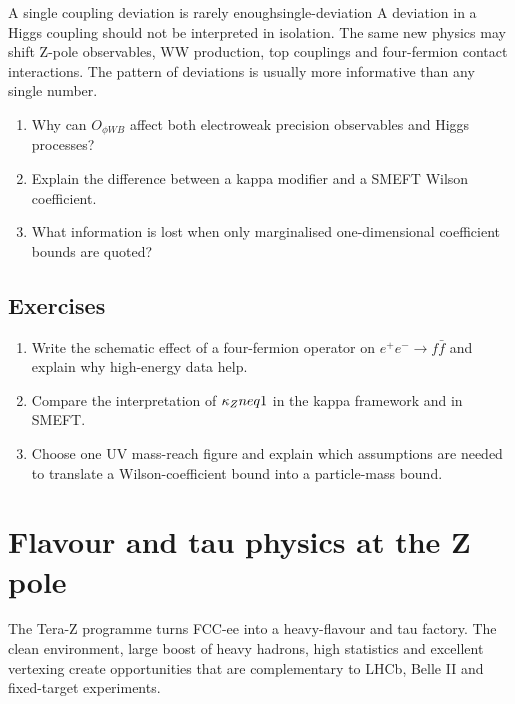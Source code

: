 \documentclass[11pt,a4paper]{article}
\numberwithin{equation}{section}
\begin{document}
\begin{remarkbox}{A single coupling deviation is rarely enough}{single-deviation}
A deviation in a Higgs coupling should not be interpreted in isolation. The same new physics may shift Z-pole observables, WW production, top couplings and four-fermion contact interactions. The pattern of deviations is usually more informative than any single number.
\end{remarkbox}

\begin{guidedchecksbox}
\begin{enumerate}[leftmargin=1.6em]
\item Why can \(O_{\phi WB}\) affect both electroweak precision observables and Higgs processes?
\item Explain the difference between a kappa modifier and a SMEFT Wilson coefficient.
\item What information is lost when only marginalised one-dimensional coefficient bounds are quoted?
\end{enumerate}
\end{guidedchecksbox}

\subsection{Exercises}
\begin{enumerate}[leftmargin=1.6em]
\item Write the schematic effect of a four-fermion operator on \(e^+e^-\to f\bar f\) and explain why high-energy data help.
\item Compare the interpretation of \(\kappa_Z\\neq1\) in the kappa framework and in SMEFT.
\item Choose one UV mass-reach figure and explain which assumptions are needed to translate a Wilson-coefficient bound into a particle-mass bound.
\end{enumerate}


\newpage
\section{Flavour and tau physics at the Z pole}
\begin{guidelinebox}
The Tera-Z programme turns FCC-ee into a heavy-flavour and tau factory. The clean environment, large boost of heavy hadrons, high statistics and excellent vertexing create opportunities that are complementary to LHCb, Belle II and fixed-target experiments.
\end{guidelinebox}
\end{document}
